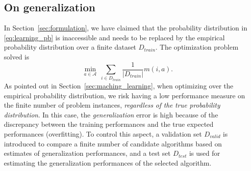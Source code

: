 \documentclass[11pt]{article}
\begin{document}
	\subsection{On generalization}
		\label{sec:generalization}
		In Section~\ref{sec:formulation}, we have claimed that the probability distribution in
		\eqref{eq:learning_pb} is inaccessible and needs to be replaced by the empirical probability
		distribution over a finite dataset $D_{train}$.
		The optimization problem solved is
		\begin{equation}
			\label{eq:learning_pb_empirical}
			    \min_{a \in \mathcal{A}}\ \sum_{i \in D_{train}} \frac{1}{|D_{train}|} m(i, a).
		\end{equation}
		As pointed out in Section~\ref{sec:maching_learning}, when optimizing over
		the empirical probability distribution, we risk having a low performance measure on the finite
		number of problem instances, \emph{regardless of the true probability distribution}.
		In this case, the \emph{generalization} error is high because of the discrepancy between the
		training performances and the true expected performances (overfitting).
		To control this aspect, a validation set $D_{valid}$ is introduced to compare a finite number of
		candidate algorithms based on estimates of generalization performances, and a test set $D_{test}$
		is used for estimating the generalization performances of the selected algorithm.
\end{document}
